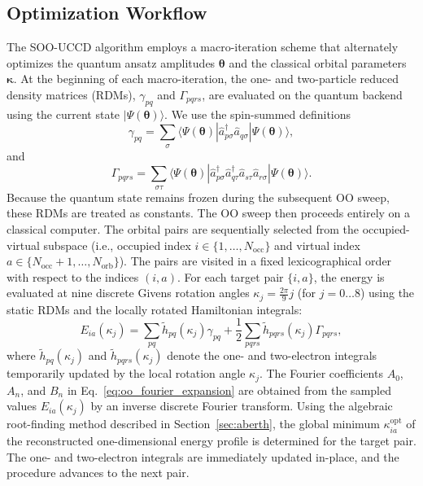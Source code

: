 \documentclass[
 reprint,
 amsmath,amssymb,
 aps,
 physrev,
]{revtex4-2}
\begin{document}
\subsection{Optimization Workflow}
%
The SOO-UCCD algorithm employs a macro-iteration scheme that alternately optimizes the quantum ansatz amplitudes \( \bm{\theta} \) and the classical orbital parameters \( \bm{\kappa} \).
%
At the beginning of each macro-iteration, the one- and two-particle reduced density matrices (RDMs), \( \gamma_{pq} \) and \( \Gamma_{pqrs} \), are evaluated on the quantum backend using the current state \( |\Psi(\bm{\theta})\rangle \). We use the spin-summed definitions
%
\begin{equation}
    \gamma_{pq} = \sum_{\sigma} \langle \Psi(\bm{\theta}) | \hat{a}_{p\sigma}^{\dagger} \hat{a}_{q\sigma} | \Psi(\bm{\theta}) \rangle,
\end{equation}
%
and
%
\begin{equation}
    \Gamma_{pqrs} = \sum_{\sigma\tau} \langle \Psi(\bm{\theta}) | \hat{a}_{p\sigma}^{\dagger} \hat{a}_{q\tau}^{\dagger} \hat{a}_{s\tau} \hat{a}_{r\sigma} | \Psi(\bm{\theta}) \rangle.
\end{equation}
%
Because the quantum state remains frozen during the subsequent OO sweep, these RDMs are treated as constants.
%
The OO sweep then proceeds entirely on a classical computer. The orbital pairs are sequentially selected from the occupied-virtual subspace (i.e., occupied index \( i \in \{1, \dots, N_{\text{occ}}\} \) and virtual index \( a \in \{N_{\text{occ}}+1, \dots, N_{\text{orb}}\} \)). The pairs are visited {\color{black}in a fixed lexicographical order with respect to the indices \((i, a)\)}. For each target pair \( \{i, a\} \), the energy is evaluated at nine discrete Givens rotation angles \( \kappa_j = \frac{2\pi}{9} j \) (for \( j=0 \dots 8 \)) using the static RDMs and the locally rotated Hamiltonian integrals:
%
\begin{equation}
    \label{eq:energy_sweep}
    E_{ia}(\kappa_j) = \sum_{pq} \tilde{h}_{pq}(\kappa_j) \gamma_{pq} + \frac{1}{2} \sum_{pqrs} \tilde{h}_{pqrs}(\kappa_j) \Gamma_{pqrs},
\end{equation}
%
where \( \tilde{h}_{pq}(\kappa_j) \) and \( \tilde{h}_{pqrs}(\kappa_j) \) denote the one- and two-electron integrals temporarily updated by the local rotation angle \( \kappa_j \).
The Fourier coefficients \( A_0 \), \( A_n \), and \( B_n \) in Eq.~\eqref{eq:oo_fourier_expansion} are obtained from the sampled values \( E_{ia}(\kappa_j) \) by an inverse discrete Fourier transform.
%
Using the algebraic root-finding method described in Section~\ref{sec:aberth}, the global minimum \( \kappa_{ia}^{\text{opt}} \) of the reconstructed one-dimensional energy profile is determined for the target pair. The one- and two-electron integrals are immediately updated in-place, and the procedure advances to the next pair.
\end{document}
